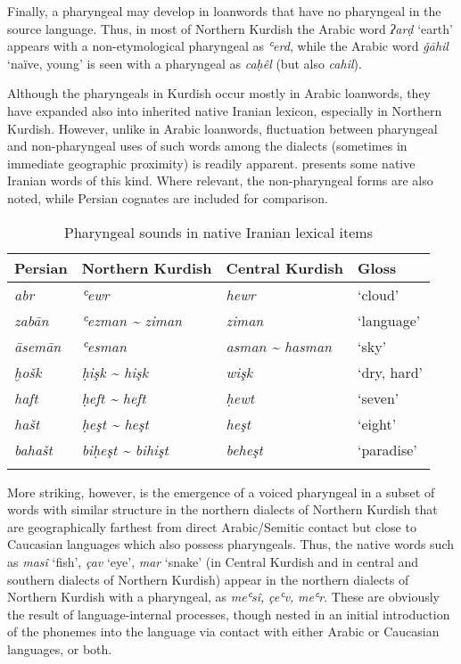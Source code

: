 \documentclass[output=paper]{langsci/langscibook}
\begin{document}
Finally, a pharyngeal may develop in loanwords that have no pharyngeal in the source language. Thus, in most of Northern Kurdish the Arabic word \textit{ʔarḍ} ‘earth’ appears with a non-etymological pharyngeal as \textit{ʿerd}, while the Arabic word \textit{ǧāhil} ‘naïve, young’ is seen with a pharyngeal as \textit{caḥêl} (but also \textit{cahil}).    

Although the pharyngeals in Kurdish occur mostly in Arabic loanwords, they have expanded also into inherited native Iranian lexicon, especially in Northern Kurdish. However, unlike in Arabic loanwords, fluctuation between pharyngeal and non-pharyngeal uses of such words among the dialects (sometimes in immediate geographic proximity) is readily apparent.  presents some native Iranian words of this kind. Where relevant, the non-pharyngeal forms are also noted, while Persian cognates are included for comparison.  

\begin{table}
\begin{tabular}{llll}
\lsptoprule
{Persian} & {Northern Kurdish} & {Central Kurdish} & {Gloss}\\\midrule
\textit{abr} & \textit{ʿewr} & \textit{hewr} & ‘cloud’\\
\textit{zabān} & \textit{ʿezman {\textasciitilde} ziman} & \textit{ziman} & ‘language’\\
\textit{āsemān} & \textit{ʿesman} & \textit{asman {\textasciitilde} hasman} & ‘sky’\\
\textit{ḫošk} & \textit{ḥişk {\textasciitilde} hişk}  & \textit{wişk} & ‘dry, hard’\\
\textit{haft} & \textit{ḥeft {\textasciitilde} heft} & \textit{ḥewt}  & ‘seven’\\
\textit{hašt} & \textit{ḥeşt {\textasciitilde} heşt} & \textit{heşt} & ‘eight’\\
\textit{bahašt} & \textit{biḥeşt {\textasciitilde} bihişt} & \textit{beheşt} & ‘paradise’\\
\lspbottomrule
\end{tabular}
\caption{\label{bkm:Ref14705119}Pharyngeal sounds in native Iranian lexical items}
\label{tab:opengin:4}
\end{table}

More striking, however, is the emergence of a voiced pharyngeal in a subset of words with similar structure in the northern dialects of Northern Kurdish that are geographically farthest from direct Arabic/Semitic contact but close to Caucasian languages which also possess pharyngeals. Thus, the native words such as \textit{masî} ‘fish’, \textit{çav} ‘eye’, \textit{mar} ‘snake’ (in Central Kurdish and in central and southern dialects of Northern Kurdish) appear in the northern dialects of Northern Kurdish with a pharyngeal, as \textit{meʿsî,} \textit{çeʿv,} \textit{meʿr}. These are obviously the result of language-internal processes, though nested in an initial introduction of the phonemes into the language via contact with either Arabic or Caucasian languages, or both.
\end{document}
